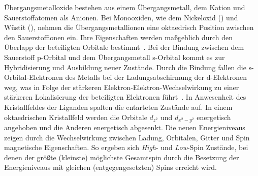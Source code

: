         Übergangsmetalloxide bestehen aus einem Übergangsmetall, dem Kation und Sauerstoffatomen als Anionen.
        Bei Monooxiden, wie dem Nickeloxid () und Wüstit (), nehmen die Übergangsmetallionen eine oktaedrisch Position zwischen den Sauerstoffionen ein.
        Ihre Eigenschaften werden maßgeblich durch den Überlapp der beteiligten Orbitale bestimmt~\cite{kupper_electronic_2005}.
        Bei der Bindung zwischen dem Sauerstoff p-Orbital und dem Übergangsmetall s-Orbital kommt es zur Hybridisierung und Ausbildung neuer Zustände.
        Durch die Bindung fallen die s-Orbital-Elektronen des Metalls bei der Ladungsabschirmung der d-Elektronen weg, was in Folge der stärkeren Elektron-Elektron-Wechselwirkung zu einer stärkeren Lokalisierung der beteiligten Elektronen führt~\cite{dane_beschreibung_2008}.
        In Anwesenheit des Kristallfeldes der Liganden spalten die entarteten Zustände auf.
        In einem oktaedrischen Kristallfeld werden die Orbitale $d_{z^2}$ und $d_{x^2-y^2}$ energetisch angehoben und die Anderen energetisch abgesenkt.
        Die neuen Energieniveaus zeigen durch die Wechselwirkung zwischen Ladung, Orbitalen, Gitter und Spin magnetische Eigenschaften.
        So ergeben sich \textit{High}- und \textit{Low}-Spin Zustände, bei denen der größte (kleinste) möglichste Gesamtspin durch die Besetzung der Energieniveaus mit gleichen (entgegengesetzten) Spins erreicht wird.

